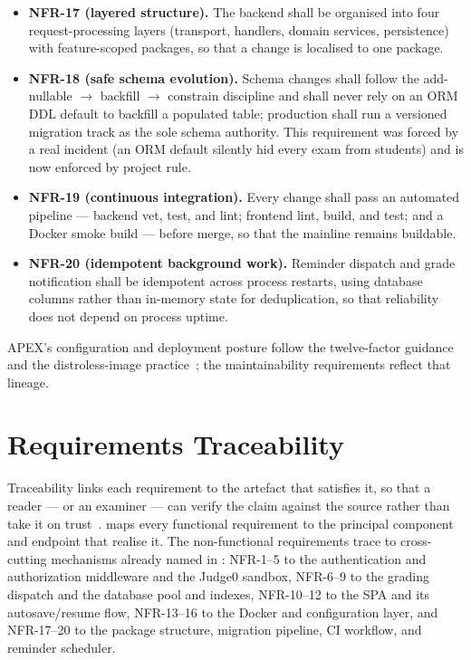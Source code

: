 \begin{itemize}[leftmargin=1.4em]
  \item \textbf{NFR-17 (layered structure).} The backend shall be organised into four
        request-processing layers (transport, handlers, domain services, persistence)
        with feature-scoped packages, so that a change is localised to one package.
  \item \textbf{NFR-18 (safe schema evolution).} Schema changes shall follow the
        add-nullable $\rightarrow$ backfill $\rightarrow$ constrain discipline and shall
        never rely on an ORM DDL default to backfill a populated table; production shall
        run a versioned migration track as the sole schema authority. This requirement
        was forced by a real incident (an ORM default silently hid every exam from
        students) and is now enforced by project rule.
  \item \textbf{NFR-19 (continuous integration).} Every change shall pass an automated
        pipeline --- backend vet, test, and lint; frontend lint, build, and test; and a
        Docker smoke build --- before merge, so that the mainline remains buildable.
  \item \textbf{NFR-20 (idempotent background work).} Reminder dispatch and grade
        notification shall be idempotent across process restarts, using database columns
        rather than in-memory state for deduplication, so that reliability does not depend
        on process uptime.
\end{itemize}

APEX's configuration and deployment posture follow the twelve-factor
guidance~\cite{twelvefactor} and the distroless-image practice~\cite{distroless}; the
maintainability requirements reflect that lineage.

\section{Requirements Traceability}
\label{sec:req-trace}

Traceability links each requirement to the artefact that satisfies it, so that a reader
--- or an examiner --- can verify the claim against the source rather than take it on
trust~\cite{sommerville-se}.  maps every functional requirement to the
principal component and endpoint that realise it. The non-functional requirements trace
to cross-cutting mechanisms already named in : NFR-1--5 to the
authentication and authorization middleware and the Judge0 sandbox, NFR-6--9 to the
grading dispatch and the database pool and indexes, NFR-10--12 to the SPA and its
autosave/resume flow, NFR-13--16 to the Docker and configuration layer, and NFR-17--20 to
the package structure, migration pipeline, CI workflow, and reminder scheduler.

